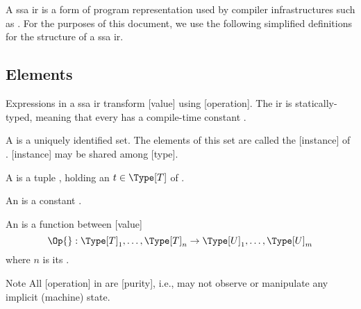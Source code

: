 \section{ }

A \gls{ssa} \gls{ir} is a form of program representation used by compiler infrastructures such as \LLVM.
For the purposes of this document, we use the following simplified definitions for the structure of a \gls{ssa} \gls{ir}.

\subsection{Elements}

Expressions in a \gls{ssa} \gls{ir} transform [value] using [operation].
The \gls{ir} is statically-typed, meaning that every  has a compile-time constant .

\begin{definition}[Type]
    A  \Type[T] is a uniquely identified set.
    The elements of this set are called the [instance] of \Type[T].
    [instance] may be shared among [type].
\end{definition}

\begin{definition}[Value]
    A  is a tuple \Value[T][t], holding an  \(t \in \Type[T]\) of  \Type[T].
\end{definition}

\begin{definition}[Attribute]
    An  is a constant .
\end{definition}

\begin{definition}[Operation]
    An  \Op{} is a function between [value]
    \begin{equation*}
        \Op{} : \Type[T]_1, \ldots, \Type[T]_n \to \Type[U]_1, \ldots, \Type[U]_m
    \end{equation*}
    where \(n\) is its .
\end{definition}

\begin{remark}{Note}
    All [operation] in \basetwo are [purity], i.e., may not observe or manipulate any implicit (machine) state.
\end{remark}

